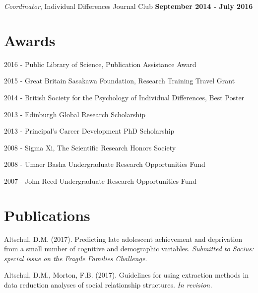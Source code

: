 \documentclass[margin,line]{res}
\newenvironment{list1}{
  \begin{list}{\ding{113}}{%
      \setlength{\itemsep}{0in}
      \setlength{\parsep}{0in} \setlength{\parskip}{0in}
      \setlength{\topsep}{0in} \setlength{\partopsep}{0in} 
      \setlength{\leftmargin}{0.17in}}}{\end{list}}
\begin{document}
\begin{resume}
\vspace{-.2cm}
{\em Coordinator}, Individual Differences Journal Club \hfill   {\bf September 2014 - July 2016}\\
\vspace{-.5cm}


\vspace{0.7cm}

\section{\sc Awards} 
\begin{list1}

\item[2016] - Public Library of Science, Publication Assistance Award
\item[2015] - Great Britain Sasakawa Foundation, Research Training Travel Grant
\item[2014] - British Society for the Psychology of Individual Differences, Best Poster
\item[2013] - Edinburgh Global Research Scholarship
\item[2013] - Principal's Career Development PhD Scholarship
\item[2008] - Sigma Xi, The Scientific Research Honors Society
\item[2008] - Umaer Basha Undergraduate Research Opportunities Fund
\item[2007] - John Reed Undergraduate Research Opportunities Fund

\end{list1}

\vspace{0.7cm}

\section{\sc Publications} 

Altschul, D.M. (2017). Predicting late adolescent achievement and deprivation from a small number of cognitive and demographic variables. {\it Submitted to Socius: special issue on the Fragile Families Challenge.} 

Altschul, D.M., Morton, F.B. (2017). Guidelines for using extraction methods in data reduction analyses of social relationship structures.  {\it In revision.}



\end{resume}
\end{document}
